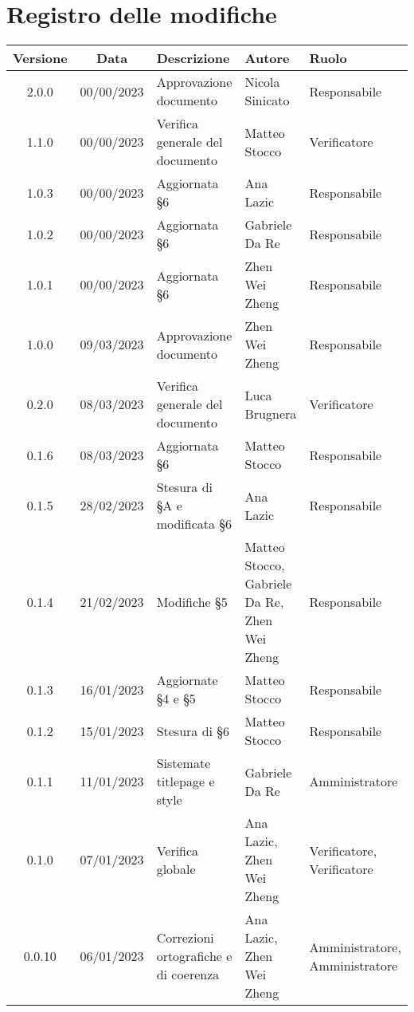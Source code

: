\section*{Registro delle modifiche}
\begin{center}
	\renewcommand\tabularxcolumn[1]{>{\Centering}m{#1}}
	\setlength\extrarowheight{5pt}
	\begin{tabularx}{\textwidth}{| c | c | X | X | X |} 
		\hline
		\rowcolor{white}
		\textbf{Versione} & \textbf{Data} & \textbf{Descrizione} & 	\textbf{Autore} & \textbf{Ruolo}\\
		\hline
	 	2.0.0 & 00/00/2023 & Approvazione documento & Nicola Sinicato & Responsabile \\
		\hline
	 	1.1.0 & 00/00/2023 & Verifica generale del documento & Matteo Stocco & Verificatore \\
		\hline
	 	1.0.3 & 00/00/2023 & Aggiornata §6 & Ana Lazic & Responsabile \\
		\hline
	 	1.0.2 & 00/00/2023 & Aggiornata §6 & Gabriele Da Re & Responsabile \\
		\hline
	 	1.0.1 & 00/00/2023 & Aggiornata §6 & Zhen Wei Zheng & Responsabile \\
		\hline
	 	1.0.0 & 09/03/2023 & Approvazione documento & Zhen Wei Zheng & Responsabile \\
		\hline
		0.2.0 & 08/03/2023 & Verifica generale del documento & Luca Brugnera & Verificatore \\
		\hline
		0.1.6 & 08/03/2023 & Aggiornata §6 & Matteo Stocco & Responsabile \\
        	\hline
		0.1.5 & 28/02/2023 & Stesura di §A e modificata §6 & Ana Lazic & Responsabile \\
        	\hline
		0.1.4 & 21/02/2023 & Modifiche §5 & Matteo Stocco, Gabriele Da Re, Zhen Wei Zheng & Responsabile \\
		\hline
		0.1.3 & 16/01/2023 & Aggiornate §4 e §5 & Matteo Stocco & Responsabile \\
		\hline
		0.1.2 & 15/01/2023 & Stesura di §6 & Matteo Stocco & Responsabile \\
    		\hline
		0.1.1 & 11/01/2023 & Sistemate titlepage e style & Gabriele Da Re & Amministratore \\
	  	\hline
		0.1.0 & 07/01/2023 & Verifica globale & Ana Lazic, Zhen Wei Zheng & Verificatore, Verificatore \\
	  	\hline
		0.0.10 & 06/01/2023 & Correzioni ortografiche e di coerenza & Ana Lazic, Zhen Wei Zheng & Amministratore, Amministratore \\

\end{tabularx}
\end{center}
